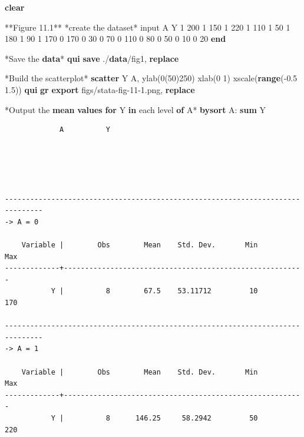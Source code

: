 \documentclass[
  10pt,
]{book}
\newenvironment{Shaded}{\begin{snugshade}}{\end{snugshade}}
\newcommand{\BaseNTok}[1]{\textcolor[rgb]{0.00,0.00,0.81}{#1}}
\newcommand{\DecValTok}[1]{\textcolor[rgb]{0.00,0.00,0.81}{#1}}
\newcommand{\KeywordTok}[1]{\textcolor[rgb]{0.13,0.29,0.53}{\textbf{#1}}}
\newcommand{\NormalTok}[1]{#1}
\begin{document}
\begin{Shaded}
\begin{Highlighting}[]
\KeywordTok{clear}

\NormalTok{**Figure 11.1**}
\NormalTok{*create the dataset*}
\NormalTok{input A Y}
\NormalTok{1 200}
\NormalTok{1 150}
\NormalTok{1 220}
\NormalTok{1 110}
\NormalTok{1 50}
\NormalTok{1 180}
\NormalTok{1 90}
\NormalTok{1 170}
\NormalTok{0 170}
\NormalTok{0 30}
\NormalTok{0 70}
\NormalTok{0 110}
\NormalTok{0 80}
\NormalTok{0 50}
\NormalTok{0 10}
\NormalTok{0 20}
\KeywordTok{end}

\NormalTok{*Save the }\KeywordTok{data}\NormalTok{*}
\KeywordTok{qui} \KeywordTok{save}\NormalTok{ ./}\KeywordTok{data}\NormalTok{/fig1, }\KeywordTok{replace}

\NormalTok{*Build the scatterplot*}
\KeywordTok{scatter}\NormalTok{ Y A, ylab(0(50)250) xlab(0 1) }\BaseNTok{xscale}\NormalTok{(}\KeywordTok{range}\NormalTok{({-}0.5 1.5))}
\KeywordTok{qui} \KeywordTok{gr} \KeywordTok{export}\NormalTok{ figs/stata{-}fig{-}11{-}1.png, }\KeywordTok{replace}

\NormalTok{*Output the }\KeywordTok{mean} \KeywordTok{values} \KeywordTok{for}\NormalTok{ Y }\KeywordTok{in}\NormalTok{ each }\DecValTok{level} \KeywordTok{of}\NormalTok{ A*}
\KeywordTok{bysort}\NormalTok{ A: }\KeywordTok{sum}\NormalTok{ Y}
\end{Highlighting}
\end{Shaded}

\begin{verbatim}
             A          Y





-------------------------------------------------------------------------------
-> A = 0

    Variable |        Obs        Mean    Std. Dev.       Min        Max
-------------+---------------------------------------------------------
           Y |          8        67.5    53.11712         10        170

-------------------------------------------------------------------------------
-> A = 1

    Variable |        Obs        Mean    Std. Dev.       Min        Max
-------------+---------------------------------------------------------
           Y |          8      146.25     58.2942         50        220
\end{verbatim}
\end{document}
